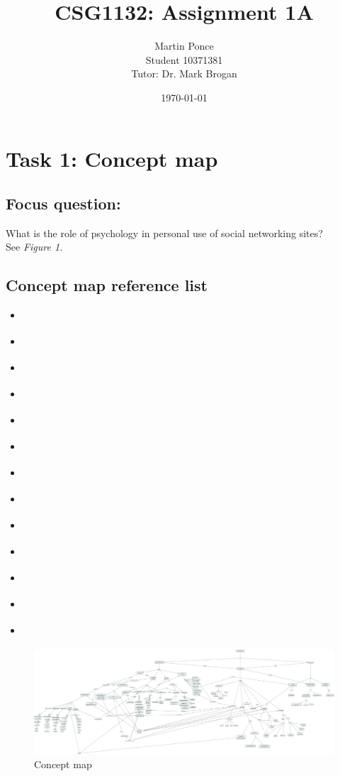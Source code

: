 \documentclass[12pt,a4paper]{report}
\title{CSG1132: Assignment 1A}
\author{Martin Ponce\\Student 10371381\\Tutor: Dr. Mark Brogan}
\date{\today}
\begin{document}
\maketitle

\section*{\textsf{Task 1: Concept map}}
\subsection*{\textsf{Focus question:}}
What is the role of psychology in personal use of social networking sites?\\

See \emph{Figure 1.}

\subsection*{\textsf{Concept map reference list}}
\begin{itemize}
\item \citet*{Pai2013}
\item \citet*{McAndrew2012}
\item \citet*{Nadkarni2012}
\item \citet*{Moore2012}
\item \citet*{Ross2009}
\item \citet*{Toma2013}
\item \citet*{Ellison2007}
\item \citet*{Park2011}
\item \citet*{Anderson2012}
\item \citet*{Ku2013}
\item \citet*{Rosen2013}
\item \citet*{Trottier2012}
\item \citet*{Kwan2013}

\end{itemize}

\newpage
\thispagestyle{empty}
\begin{landscape}
\begin{figure}[H]
	\centering
	\caption{Concept map}
	\includegraphics[scale=0.13]{test.png}
\end{figure}
\end{landscape}
\end{document}
